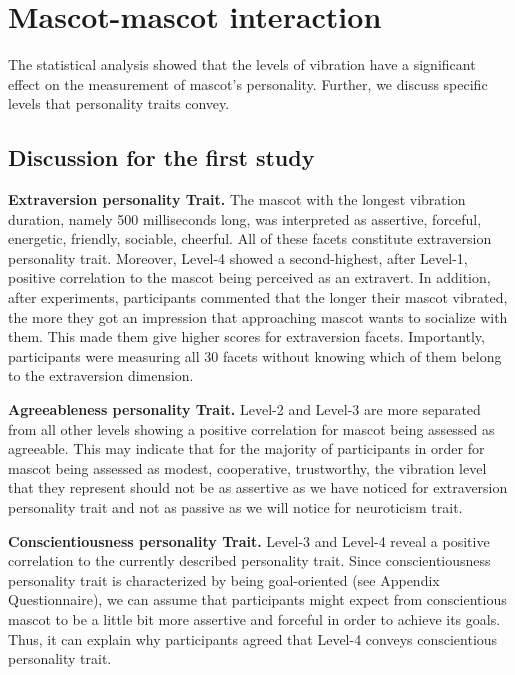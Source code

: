 \section{Mascot-mascot interaction}
\label{sec:mascot-mascot-interaction}
The statistical analysis showed that the levels of vibration have a significant effect on the
measurement of mascot's personality.
Further, we discuss specific levels that personality traits convey.

\subsection{Discussion for the first study}
\label{subsec:discussion-for-the-first-study2}

\par\textbf{Extraversion personality Trait.}
The mascot with the longest vibration duration, namely 500 milliseconds long, was interpreted as assertive,
forceful, energetic, friendly, sociable, cheerful.
All of these facets constitute extraversion personality trait.
Moreover, Level-4 showed a second-highest, after Level-1, positive correlation to the mascot
being perceived as an extravert.
In addition, after experiments, participants commented that the longer their mascot vibrated,
the more they got an impression that approaching mascot wants to socialize with them.
This made them give higher scores for extraversion facets.
Importantly, participants were measuring all 30 facets without knowing which of them
belong to the extraversion dimension.

\par\textbf{Agreeableness personality Trait.}
Level-2 and Level-3 are more separated from all other levels showing a positive correlation
for mascot being assessed as agreeable.
This may indicate that for the majority of participants in order for mascot being assessed as modest,
cooperative, trustworthy, the vibration level that they represent should not be as assertive as we have
noticed for extraversion personality trait and not as passive as we will notice for neuroticism trait.

\par\textbf{Conscientiousness personality Trait.}
Level-3 and Level-4 reveal a positive correlation to the currently described personality trait.
Since conscientiousness personality trait is characterized by being goal-oriented (see Appendix Questionnaire),
we can assume that participants might expect from conscientious mascot to be a little bit more assertive and
forceful in order to achieve its goals.
Thus, it can explain why participants agreed that Level-4 conveys conscientious personality trait.

